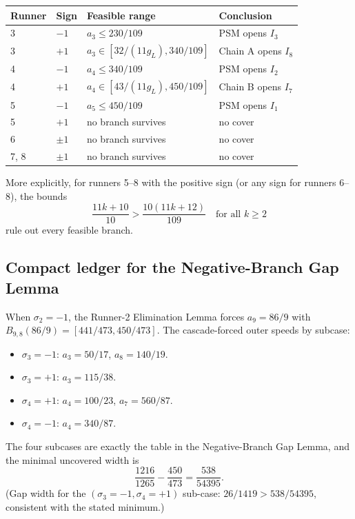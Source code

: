 \documentclass[12pt]{article}
\begin{document}
\begin{center}
\begin{tabular}{@{}llll@{}}
\toprule
Runner & Sign & Feasible range & Conclusion \\
\midrule
3 & $-1$ & $a_3\le 230/109$ & PSM opens $I_3$ \\
3 & $+1$ & $a_3\in[32/(11g_L),340/109]$ & Chain A opens $I_8$ \\
4 & $-1$ & $a_4\le 340/109$ & PSM opens $I_2$ \\
4 & $+1$ & $a_4\in[43/(11g_L),450/109]$ & Chain B opens $I_7$ \\
5 & $-1$ & $a_5\le 450/109$ & PSM opens $I_1$ \\
5 & $+1$ & no branch survives & no cover \\
6 & $\pm1$ & no branch survives & no cover \\
7, 8 & $\pm1$ & no branch survives & no cover \\
\bottomrule
\end{tabular}
\end{center}

More explicitly, for runners 5--8 with the positive sign (or any sign for runners 6--8),
the bounds
\[
\frac{11k+10}{10} > \frac{10(11k+12)}{109}\quad\text{for all }k\ge 2
\]
rule out every feasible branch.

\subsection{Compact ledger for the Negative-Branch Gap Lemma}

When $\sigma_2=-1$, the Runner-2 Elimination Lemma forces $a_9=86/9$ with
$B_{9,8}(86/9)=[441/473,450/473]$. The cascade-forced outer speeds by subcase:

\begin{itemize}
\item $\sigma_3=-1$: $a_3=50/17$, $a_8=140/19$.
\item $\sigma_3=+1$: $a_3=115/38$.
\item $\sigma_4=+1$: $a_4=100/23$, $a_7=560/87$.
\item $\sigma_4=-1$: $a_4=340/87$.
\end{itemize}

The four subcases are exactly the table in the Negative-Branch Gap Lemma, and the
minimal uncovered width is
\[
\frac{1216}{1265} - \frac{450}{473} = \frac{538}{54395}.
\]
(Gap width for the $(\sigma_3=-1,\sigma_4=+1)$ sub-case: $26/1419 > 538/54395$,
consistent with the stated minimum.)
\end{document}
